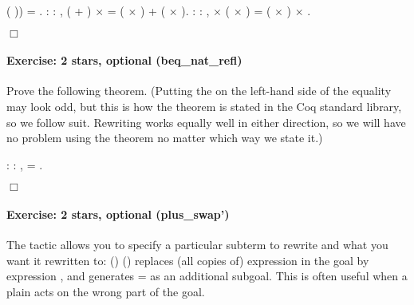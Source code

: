 \documentclass[12pt]{report}
\begin{document}
\begin{coqdoccode}
( ))\coqdoceol
\coqdocindent{1.00em}
= .\coqdoceol
 \coqdocemptyline
\coqdocnoindent
{}  : \coqdockw{\ensuremath{\forall}}    : ,\coqdoceol
\coqdocindent{1.00em}
( + ) \ensuremath{\times}  = ( \ensuremath{\times} ) + ( \ensuremath{\times} ).\coqdoceol
 \coqdocemptyline
\coqdocnoindent
{}  : \coqdockw{\ensuremath{\forall}}    : ,\coqdoceol
\coqdocindent{1.00em}
 \ensuremath{\times} ( \ensuremath{\times} ) = ( \ensuremath{\times} ) \ensuremath{\times} .\coqdoceol
 \end{coqdoccode}
\ensuremath{\Box} 

\paragraph{Exercise: 2 stars, optional (beq\_nat\_refl)}

 Prove the following theorem.  (Putting the  on the left-hand
    side of the equality may look odd, but this is how the theorem is
    stated in the Coq standard library, so we follow suit.  Rewriting
    works equally well in either direction, so we will have no problem
    using the theorem no matter which way we state it.) \begin{coqdoccode}
\coqdocemptyline
\coqdocnoindent
{}  : \coqdockw{\ensuremath{\forall}}  : ,\coqdoceol
\coqdocindent{1.00em}
 =   .\coqdoceol
 \end{coqdoccode}
\ensuremath{\Box} 

\paragraph{Exercise: 2 stars, optional (plus\_swap')}

 The  tactic allows you to specify a particular subterm to
   rewrite and what you want it rewritten to:  ()  ()
   replaces (all copies of) expression  in the goal by expression
   , and generates  =  as an additional subgoal. This is often
   useful when a plain  acts on the wrong part of the goal.
\end{document}
